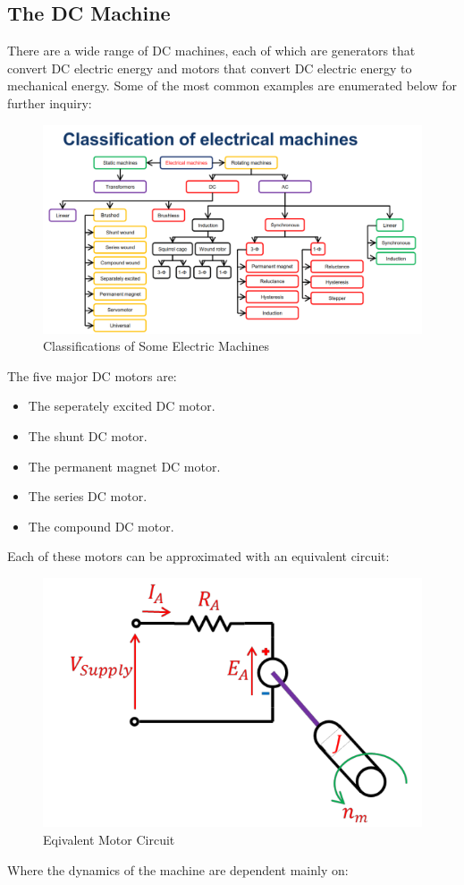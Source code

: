\documentclass{book}
\begin{document}
\subsection{The DC Machine}
There are a wide range of DC machines, each of which are generators that convert DC electric energy and motors that convert DC electric energy to mechanical energy. Some of the most common examples are enumerated below for further inquiry:
\begin{figure}[h]
	\centering
	\includegraphics[width=0.4\linewidth]{Screenshots/classification_of_machine}
	\caption{Classifications of Some Electric Machines}
	\label{fig:classificationofmachine}
\end{figure}

The five major DC motors are:

\begin{itemize}
	\item The seperately excited DC motor.
	\item The shunt DC motor. 
	\item The permanent magnet DC motor.
	\item The series DC motor.
	\item The compound DC motor.	
\end{itemize}

Each of these motors can be approximated with an equivalent circuit:

\begin{figure}[h]
	\centering
	\includegraphics[width=0.5\linewidth]{Screenshots/equivalent_motor_circuit}
	\caption{Eqivalent Motor Circuit}
	\label{fig:equivalentmotorcircuit}
\end{figure}

Where the dynamics of the machine are dependent mainly on:
\end{document}
